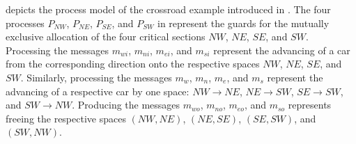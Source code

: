 \Fig{\ref{fig_cross_proc_dl}} depicts the process model of the crossroad example introduced in \Sect{\ref{sect_background_comp}}.
The four processes $P_{\mathit{NW}}$, $P_{\mathit{NE}}$, $P_{\mathit{SE}}$, and $P_{\mathit{SW}}$ in \Fig{\ref{fig_cross_proc_atomic}} represent the guards for the mutually exclusive allocation of the four critical sections $\mathit{NW}$, $\mathit{NE}$, $\mathit{SE}$, and $\mathit{SW}$.
Processing the messages $m_{wi}$, $m_{ni}$, $m_{ei}$, and $m_{si}$ represent the advancing of a car from the corresponding direction onto the respective spaces $\mathit{NW}$, $\mathit{NE}$, $\mathit{SE}$, and $\mathit{SW}$.
Similarly, processing the messages $m_{w}$, $m_{n}$, $m_{e}$, and $m_{s}$ represent the advancing of a respective car by one space: $\mathit{NW} \rightarrow \mathit{NE}$, $\mathit{NE} \rightarrow \mathit{SW}$, $\mathit{SE} \rightarrow \mathit{SW}$, and $\mathit{SW} \rightarrow \mathit{NW}$.
Producing the messages $m_{wo}$, $m_{no}$, $m_{eo}$, and $m_{so}$ represents freeing the respective spaces $(\mathit{NW}, \mathit{NE})$, $(\mathit{NE}, \mathit{SE})$, $(\mathit{SE}, \mathit{SW})$, and $(\mathit{SW}, \mathit{NW} )$.
